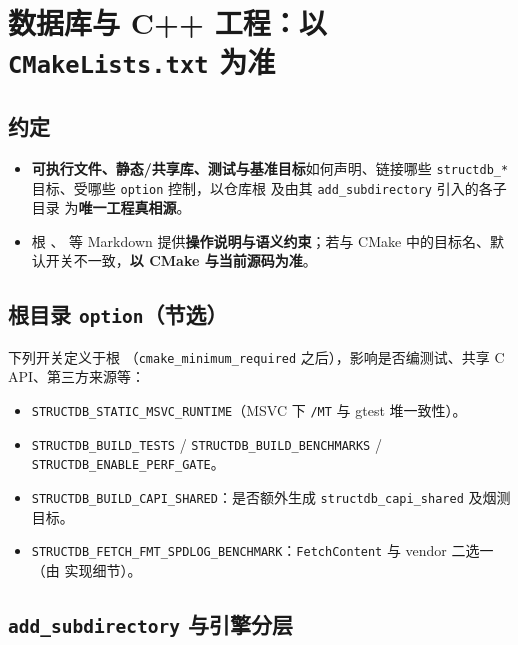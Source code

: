 \section{数据库与 C++ 工程：以 \texttt{CMakeLists.txt} 为准}
\label{sec:cmake-build}

\subsection{约定}

\begin{itemize}
  \item \textbf{可执行文件、静态/共享库、测试与基准目标}如何声明、链接哪些 \texttt{structdb\_*} 目标、受哪些 \texttt{option} 控制，以仓库根  及由其 \texttt{add\_subdirectory} 引入的各子目录  为\textbf{唯一工程真相源}。
  \item 根 、 等 Markdown 提供\textbf{操作说明与语义约束}；若与 CMake 中的目标名、默认开关不一致，\textbf{以 CMake 与当前源码为准}。
\end{itemize}

\subsection{根目录 \texttt{option}（节选）}

下列开关定义于根 （\texttt{cmake\_minimum\_required} 之后），影响是否编测试、共享 C API、第三方来源等：

\begin{itemize}
  \item \texttt{STRUCTDB\_STATIC\_MSVC\_RUNTIME}（MSVC 下 \texttt{/MT} 与 gtest 堆一致性）。
  \item \texttt{STRUCTDB\_BUILD\_TESTS} / \texttt{STRUCTDB\_BUILD\_BENCHMARKS} / \texttt{STRUCTDB\_ENABLE\_PERF\_GATE}。
  \item \texttt{STRUCTDB\_BUILD\_CAPI\_SHARED}：是否额外生成 \texttt{structdb\_capi\_shared} 及烟测目标。
  \item \texttt{STRUCTDB\_FETCH\_FMT\_SPDLOG\_BENCHMARK}：\texttt{FetchContent} 与  vendor 二选一（由  实现细节）。
\end{itemize}

\subsection{\texttt{add\_subdirectory} 与引擎分层}

